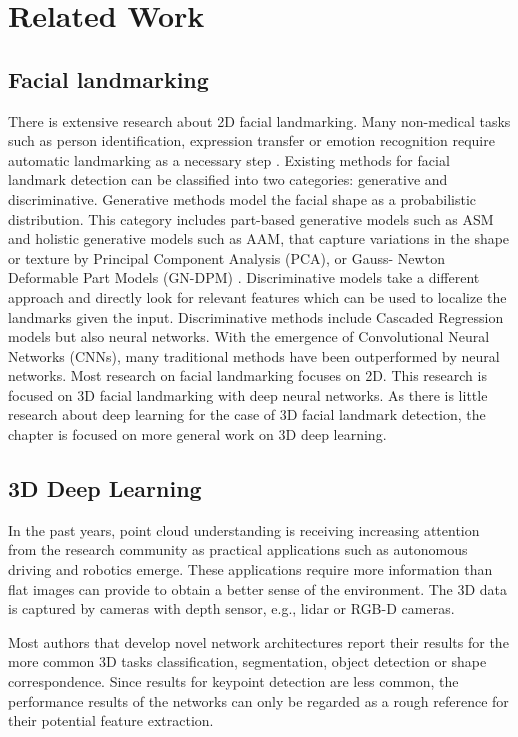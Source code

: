 \documentclass[class=article, crop=false]{standalone}
\begin{document}
\section{Related Work}
\label{sec:works}
\subsection{Facial landmarking}
There is extensive research about 2D facial landmarking. Many non-medical tasks such as person identification, expression transfer or emotion recognition require automatic landmarking as a necessary step \cite{perrot:hal-02884592}. Existing methods for facial landmark detection can be classified into two categories: generative and discriminative. Generative methods model the facial shape as a probabilistic distribution. This category includes part-based generative models such as ASM and holistic generative models such as AAM, that capture variations in the shape or texture by Principal Component Analysis (PCA), or Gauss- Newton Deformable Part Models (GN-DPM) \cite{yan:hal-02892002}. Discriminative models take a different approach and directly look for relevant features which can be used to localize the landmarks given the input. Discriminative methods include Cascaded Regression models but also neural networks. With the emergence of Convolutional Neural Networks (CNNs), many traditional methods have been outperformed by neural networks. Most research on facial landmarking focuses on 2D. This research is focused on 3D facial landmarking with deep neural networks. As there is little research about deep learning for the case of 3D facial landmark detection, the chapter is focused on more general work on 3D deep learning.

\subsection{3D Deep Learning}
In the past years, point cloud understanding is receiving increasing attention from the research community as practical applications such as autonomous driving and robotics emerge. These applications require more information than flat images can provide to obtain a better sense of the environment. The 3D data is captured by cameras with depth sensor, e.g., lidar or RGB-D cameras. 

Most authors that develop novel network architectures report their results for the more common 3D tasks classification, segmentation, object detection or shape correspondence. Since results for keypoint detection are less common, the performance results of the networks can only be regarded as a rough reference for their potential feature extraction.
\end{document}
